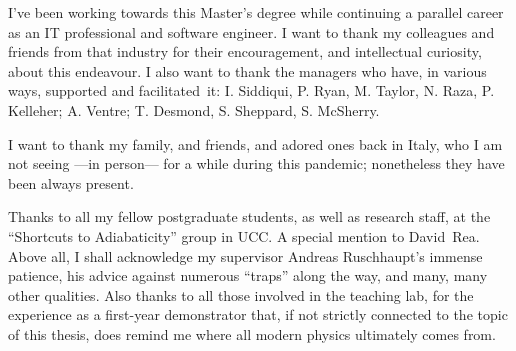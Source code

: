 { 
  I've been working towards this Master's degree
  while continuing a parallel career
  as an IT professional and software engineer.
  I want to thank my
  colleagues and friends from that industry for their encouragement,
  and intellectual curiosity,
  about this endeavour.
  I also want to thank the managers
  who have, in various ways, supported and facilitated~it:
  I. Siddiqui, P. Ryan, M. Taylor, N. Raza, P. Kelleher;
  A. Ventre;
  T. Desmond, S. Sheppard, S. McSherry.

  I want to thank my family, and friends, and adored ones back in Italy,
  who I am not seeing ---in person--- for a while during this pandemic;
  nonetheless they have been always present.

  Thanks to all my fellow postgraduate students,
  as well as research staff,
  at the ``Shortcuts to Adiabaticity'' group in UCC.
  A special mention to David~Rea.
  Above all, I shall acknowledge my supervisor Andreas Ruschhaupt's immense patience,
  his advice against numerous ``traps'' along the way, and many, many other qualities.
  Also thanks to all those involved in the teaching lab, for the experience as a
  first-year demonstrator that,
  if not strictly connected to the topic of this thesis,
  does remind me where all modern physics ultimately comes from.
}
